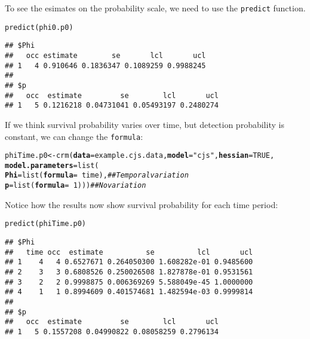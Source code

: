 \documentclass[12pt]{article}\usepackage[]{graphicx}\usepackage[]{xcolor}
\makeatletter
\newcommand{\hlnum}[1]{\textcolor[rgb]{0.69,0.494,0}{#1}}%
\newcommand{\hlsng}[1]{\textcolor[rgb]{0.749,0.012,0.012}{#1}}%
\newcommand{\hlcom}[1]{\textcolor[rgb]{0.514,0.506,0.514}{\textit{#1}}}%
\newcommand{\hlopt}[1]{\textcolor[rgb]{0,0,0}{#1}}%
\newcommand{\hldef}[1]{\textcolor[rgb]{0,0,0}{#1}}%
\newcommand{\hlkwb}[1]{\textcolor[rgb]{0,0.341,0.682}{#1}}%
\newcommand{\hlkwc}[1]{\textcolor[rgb]{0,0,0}{\textbf{#1}}}%
\newcommand{\hlkwd}[1]{\textcolor[rgb]{0.004,0.004,0.506}{#1}}%
\newenvironment{kframe}{%
 \def\at@end@of@kframe{}%
 \ifinner\ifhmode%
  \def\at@end@of@kframe{\end{minipage}}%
  \begin{minipage}{\columnwidth}%
 \fi\fi%
 \def\FrameCommand##1{\hskip\@totalleftmargin \hskip-\fboxsep
 \colorbox{shadecolor}{##1}\hskip-\fboxsep
     \hskip-\linewidth \hskip-\@totalleftmargin \hskip\columnwidth}%
 \MakeFramed {\advance\hsize-\width
   \@totalleftmargin\z@ \linewidth\hsize
   \@setminipage}}%
 {\par\unskip\endMakeFramed%
 \at@end@of@kframe}
\newenvironment{knitrout}{}{} %
\newcommand{\inr}[1]{\colorbox{inlinecolor}{\texttt{#1}}}
\makeatother
\begin{document}
To see the esimates on the probability scale, we need to use the
\inr{predict} function.

\begin{knitrout}
\color{fgcolor}\begin{kframe}
\begin{alltt}
\hlkwd{predict}\hldef{(phi0.p0)}
\end{alltt}
\begin{verbatim}
## $Phi
##   occ estimate        se       lcl       ucl
## 1   4 0.910646 0.1836347 0.1089259 0.9988245
## 
## $p
##   occ  estimate         se        lcl       ucl
## 1   5 0.1216218 0.04731041 0.05493197 0.2480274
\end{verbatim}
\end{kframe}
\end{knitrout}


If we think survival probability varies over time, but detection
probability is constant, we can change the \texttt{formula}:


\begin{knitrout}
\color{fgcolor}\begin{kframe}
\begin{alltt}
\hldef{phiTime.p0} \hlkwb{<-} \hlkwd{crm}\hldef{(}\hlkwc{data}\hldef{=example.cjs.data,} \hlkwc{model}\hldef{=}\hlsng{"cjs"}\hldef{,} \hlkwc{hessian}\hldef{=}\hlnum{TRUE}\hldef{,}
                  \hlkwc{model.parameters}\hldef{=}\hlkwd{list}\hldef{(}
                      \hlkwc{Phi}\hldef{=}\hlkwd{list}\hldef{(}\hlkwc{formula}\hldef{=}\hlopt{~}\hldef{time),}  \hlcom{## Temporal variation}
                      \hlkwc{p}\hldef{=}\hlkwd{list}\hldef{(}\hlkwc{formula}\hldef{=}\hlopt{~}\hlnum{1}\hldef{)))}      \hlcom{## No variation}
\end{alltt}
\end{kframe}
\end{knitrout}

Notice how the results now show survival probability for each time period:

\begin{knitrout}
\color{fgcolor}\begin{kframe}
\begin{alltt}
\hlkwd{predict}\hldef{(phiTime.p0)}
\end{alltt}
\begin{verbatim}
## $Phi
##   time occ  estimate          se          lcl       ucl
## 1    4   4 0.6527671 0.264050300 1.608282e-01 0.9485600
## 2    3   3 0.6808526 0.250026508 1.827878e-01 0.9531561
## 3    2   2 0.9998875 0.006369269 5.588049e-45 1.0000000
## 4    1   1 0.8994609 0.401574681 1.482594e-03 0.9999814
## 
## $p
##   occ  estimate         se        lcl       ucl
## 1   5 0.1557208 0.04990822 0.08058259 0.2796134
\end{verbatim}
\end{kframe}
\end{knitrout}
\end{document}
